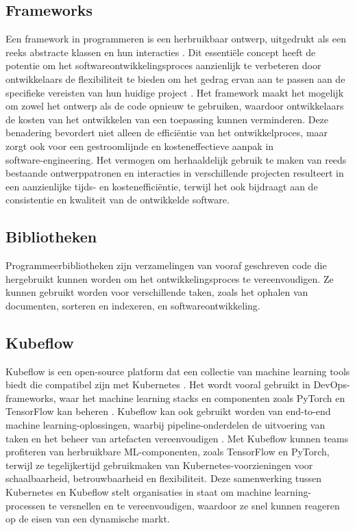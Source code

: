 \subsection{Frameworks}
Een framework in programmeren is een herbruikbaar ontwerp, uitgedrukt als een reeks abstracte klassen en hun interacties \autocite{JuhaHautamaeki1997}. Dit essentiële concept heeft de potentie om het softwareontwikkelingsproces aanzienlijk te verbeteren door ontwikkelaars de flexibiliteit te bieden om het gedrag ervan aan te passen aan de specifieke vereisten van hun huidige project \autocite{JuhaHautamaeki1997}. Het framework maakt het mogelijk om zowel het ontwerp als de code opnieuw te gebruiken, waardoor ontwikkelaars de kosten van het ontwikkelen van een toepassing kunnen verminderen. Deze benadering bevordert niet alleen de efficiëntie van het ontwikkelproces, maar zorgt ook voor een gestroomlijnde en kosteneffectieve aanpak in \\software-engineering. Het vermogen om herhaaldelijk gebruik te maken van reeds bestaande ontwerppatronen en interacties in verschillende projecten resulteert in een aanzienlijke tijds- en kostenefficiëntie, terwijl het ook bijdraagt aan de consistentie en kwaliteit van de ontwikkelde software.
\subsection{Bibliotheken}
Programmeerbibliotheken zijn verzamelingen van vooraf geschreven code die hergebruikt kunnen worden om het ontwikkelingsproces te vereenvoudigen. Ze kunnen gebruikt worden voor verschillende taken, zoals het ophalen van documenten, sorteren en indexeren, en softwareontwikkeling.
\subsection{Kubeflow}
Kubeflow is een open-source platform dat een collectie van machine learning tools biedt die compatibel zijn met Kubernetes \autocite{Stein2020}. Het wordt vooral gebruikt in DevOps-frameworks, waar het machine learning stacks en componenten zoals PyTorch en TensorFlow kan beheren \autocite{NGC2021}.
Kubeflow kan ook gebruikt worden van end-to-end machine learning-oplossingen, waarbij pipeline-onderdelen de uitvoering van taken en het beheer van artefacten vereenvoudigen \autocite{Bisong2019}.
Met Kubeflow kunnen teams profiteren van herbruikbare ML-componenten, zoals TensorFlow en PyTorch, terwijl ze tegelijkertijd gebruikmaken van Kubernetes-voorzieningen voor schaalbaarheid, betrouwbaarheid en flexibiliteit. Deze samenwerking tussen Kubernetes en Kubeflow stelt organisaties in staat om machine learning-processen te versnellen en te vereenvoudigen, waardoor ze snel kunnen reageren op de eisen van een dynamische markt.
